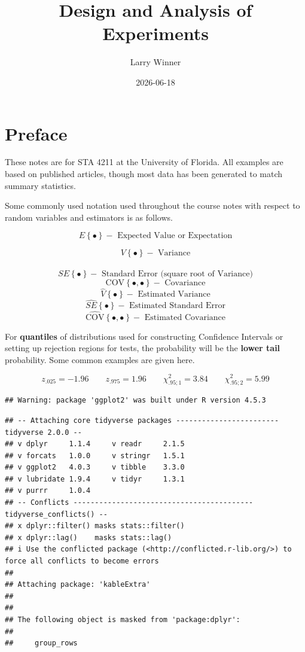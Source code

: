 \documentclass[
]{book}
\title{Design and Analysis of Experiments}
\author{Larry Winner}
\date{2026-06-18}
\begin{document}
\frontmatter
\maketitle

\mainmatter
\chapter*{Preface}\label{preface}

These notes are for STA 4211 at the University of Florida. All examples
are based on published articles, though most data has been generated to
match summary statistics.

Some commonly used notation used throughout the course notes with
respect to random variables and estimators is as follows.

\[E\left\{\bullet\right\} - \mbox{ Expected Value or Expectation} \]

\[V\left\{\bullet\right\} - \mbox{ Variance} \]\\
\[SE\left\{\bullet\right\} - \mbox{ Standard Error (square root of Variance)} \]
\[\mbox{COV}\left\{\bullet,\bullet\right\} - \mbox{ Covariance}\]
\[\hat{V}\left\{\bullet\right\} - \mbox{ Estimated Variance} \]
\[\hat{SE}\left\{\bullet\right\} - \mbox{ Estimated Standard Error} \]
\[\hat{\mbox{COV}}\left\{\bullet, \bullet\right\} - \mbox{ Estimated Covariance}\]

For \textbf{quantiles} of distributions used for constructing Confidence
Intervals or setting up rejection regions for tests, the probability
will be the \textbf{lower tail} probability. Some common examples are
given here.

\[
z_{.025}=-1.96 \qquad  z_{.975}=1.96 \qquad \chi_{.95;1}^2=3.84\qquad \chi_{.95;2}^2=5.99
\]

\begin{verbatim}
## Warning: package 'ggplot2' was built under R version 4.5.3
\end{verbatim}

\begin{verbatim}
## -- Attaching core tidyverse packages ------------------------ tidyverse 2.0.0 --
## v dplyr     1.1.4     v readr     2.1.5
## v forcats   1.0.0     v stringr   1.5.1
## v ggplot2   4.0.3     v tibble    3.3.0
## v lubridate 1.9.4     v tidyr     1.3.1
## v purrr     1.0.4     
## -- Conflicts ------------------------------------------ tidyverse_conflicts() --
## x dplyr::filter() masks stats::filter()
## x dplyr::lag()    masks stats::lag()
## i Use the conflicted package (<http://conflicted.r-lib.org/>) to force all conflicts to become errors
## 
## Attaching package: 'kableExtra'
## 
## 
## The following object is masked from 'package:dplyr':
## 
##     group_rows
\end{verbatim}
\end{document}
